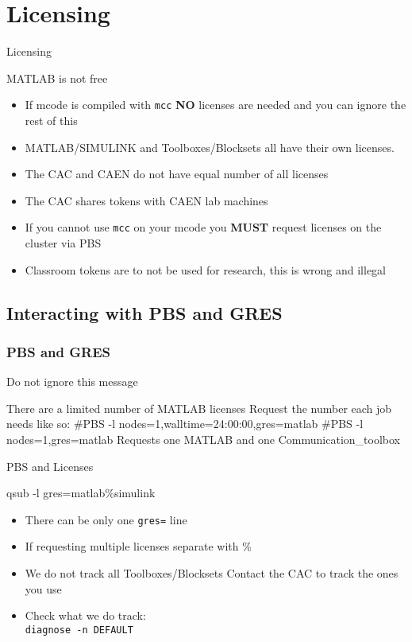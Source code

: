 \documentclass[handout]{beamer}
\begin{document}
  \section{Licensing}
  \begin{frame}{Licensing}
   \begin{block}{MATLAB is not free}
    \begin{itemize}
     \item If mcode is compiled with \texttt{mcc} {\bf NO} licenses are needed and you can ignore the rest of this
     \item MATLAB/SIMULINK and Toolboxes/Blocksets all have their own licenses.
     \item The CAC and CAEN do not have equal number of all licenses
     \item The CAC shares tokens with CAEN lab machines
     \item If you cannot use \texttt{mcc} on your mcode you {\bf MUST} request licenses on the cluster via PBS
     \item Classroom tokens are to not be used for research, this is wrong and illegal
    \end{itemize}
   \end{block}
  \end{frame}

   \subsection{Interacting with PBS and GRES}
\begin{frame}[fragile]
\frametitle{PBS and GRES}
    \begin{block}{Do not ignore this message}
     \begin{semiverbatim}
There are a limited number of MATLAB licenses
Request the number each job needs like so:
	 #PBS -l nodes=1,walltime=24:00:00,gres=matlab
	 #PBS -l nodes=1,gres=matlab%
Requests one MATLAB and one Communication_toolbox
     \end{semiverbatim}
    \end{block}
\end{frame}
\begin{frame}{PBS and Licenses}
    \begin{block}{qsub -l gres=matlab\%simulink}
     \begin{itemize}
      \item There can be only one \texttt{gres=} line
      \item If requesting multiple licenses separate with \%
      \item We do not track all Toolboxes/Blocksets Contact the CAC to track the ones you use
      \item Check what we do track: \\
\texttt{diagnose -n DEFAULT}
     \end{itemize}
    \end{block}
\end{frame}
\end{document}
